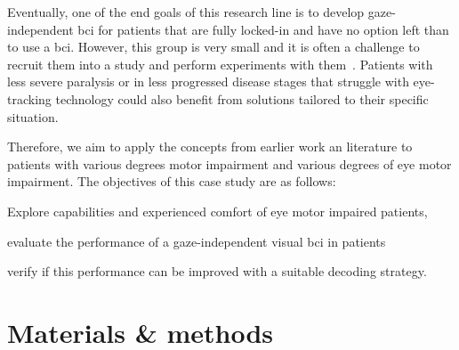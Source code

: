 Eventually, one of the end goals of this research line is to develop
gaze-independent \ac{bci} for patients that
are fully locked-in and have no option left than to use a \ac{bci}.
However, this group is very small and it is often a challenge to recruit them
into a study and perform experiments with them~\cite{Wolpaw2006}.
Patients with less severe paralysis or in less progressed disease stages that struggle with
eye-tracking technology could also benefit from
solutions tailored to their specific situation.

Therefore, we aim to apply the concepts from earlier work an literature to
patients with various degrees motor impairment and various
degrees of eye motor impairment.
The objectives of this case study are as follows:
\begin{enumerate*}
  \item Explore capabilities and experienced comfort of eye motor impaired
    patients,
  \item evaluate the performance of a gaze-independent visual \ac{bci} in patients
  \item verify if this performance can be improved with a suitable decoding
    strategy.
\end{enumerate*}


\section{Materials \& methods}
